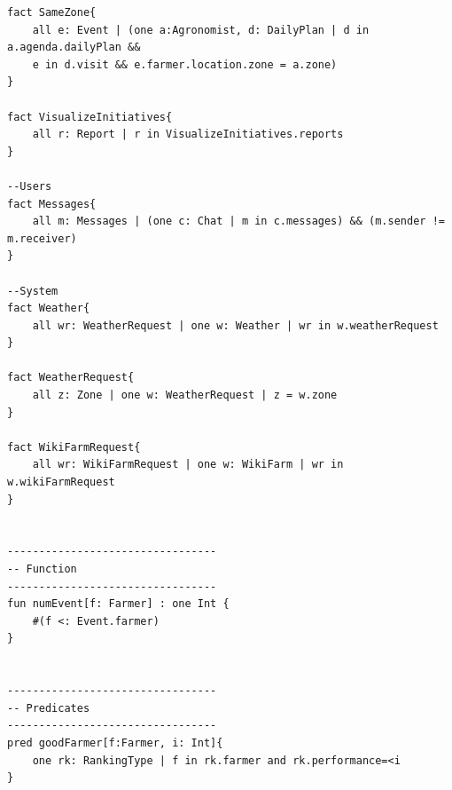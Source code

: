 \begin{lstlisting}[language=alloy]
fact SameZone{
	all e: Event | (one a:Agronomist, d: DailyPlan | d in a.agenda.dailyPlan && 
	e in d.visit && e.farmer.location.zone = a.zone)
}

fact VisualizeInitiatives{
	all r: Report | r in VisualizeInitiatives.reports
}

--Users
fact Messages{
	all m: Messages | (one c: Chat | m in c.messages) && (m.sender != m.receiver)
}

--System
fact Weather{
	all wr: WeatherRequest | one w: Weather | wr in w.weatherRequest	
}

fact WeatherRequest{
	all z: Zone | one w: WeatherRequest | z = w.zone
}

fact WikiFarmRequest{
	all wr: WikiFarmRequest | one w: WikiFarm | wr in w.wikiFarmRequest
}


---------------------------------
-- Function
---------------------------------
fun numEvent[f: Farmer] : one Int {
	#(f <: Event.farmer)
}


---------------------------------
-- Predicates
---------------------------------
pred goodFarmer[f:Farmer, i: Int]{
	one rk: RankingType | f in rk.farmer and rk.performance=<i
}
\end{lstlisting}

\newpage
